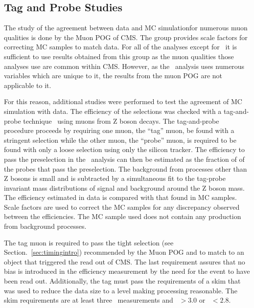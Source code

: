 \subsection{Tag and Probe Studies \label{sec:TagProbe}}
The study of the agreement between data and MC simulationfor numerous muon qualities is done by the Muon POG of CMS.
The group provides scale factors for correcting MC samples to match data.
For all of the analyses except for \muononly\  it is sufficient to use results obtained from this group as the muon qualities
those analyses use are common within CMS.
However, as the \muononly\ analysis uses numerous variables which are unique to it, the results from the muon POG are not applicable to it.

For this reason, additional studies were performed to test the agreement of MC simulation with data.
The efficiency of the selections was checked with a tag-and-probe technique~\cite{2012JInst...7P0002T} using muons from Z boson decays.
The tag-and-probe procedure proceeds by requiring one muon, the ``tag'' muon, be found with a stringent selection while the other muon, the ``probe'' muon,
is required to be found with only a loose selection using only the silicon tracker. The efficiency to pass the preselection in the \muononly\ analysis
can then be estimated as the fraction of of the probes that pass the preselection. The background from processes other than Z bosons is small and is subtracted by
a simultaneous fit to the tag-probe invariant mass distributions of signal and background around the Z boson mass.
The efficiency estimated in data is compared with that found in MC samples. Scale factors are used to correct the MC samples for any discrepancy observed between the efficiencies.
The MC sample used does not contain any production from background processes.

The tag muon is required to pass the tight selection (see Section.~\ref{sec:timingintro}) recommended by the Muon POG and to match to an object that triggered the read out of CMS. 
The last requirement assures that no bias is introduced in the efficiency measurement by the need for the event to have been read out.
Additionally, the tag must pass the requirements of a skim that was used to reduce the data size to a level
making processing reasonable. The skim requirements are at least three \dedx\ measurements and \ih\ $> 3.0$ or \ih\ $< 2.8$.

